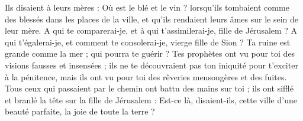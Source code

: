 Ils disaient à leurs mères : Où est le blé et le vin ? lorsqu'ils tombaient comme des blessés dans les places de la ville, et qu'ils rendaient leurs âmes sur le sein de leur mère.
A qui te comparerai-je, et à qui t'assimilerai-je, fille de Jérusalem ? A qui t'égalerai-je, et comment te consolerai-je, vierge fille de Sion ? Ta ruine est grande comme la mer ; qui pourra te guérir ?
Tes prophètes ont vu pour toi des visions fausses et insensées ; ils ne te découvraient pas ton iniquité pour t'exciter à la pénitence, mais ils ont vu pour toi des rêveries mensongères et des fuites.
Tous ceux qui passaient par le chemin ont battu des mains sur toi ; ils ont sifflé et branlé la tête sur la fille de Jérusalem : Est-ce là, disaient-ils, cette ville d'une beauté parfaite, la joie de toute la terre ?